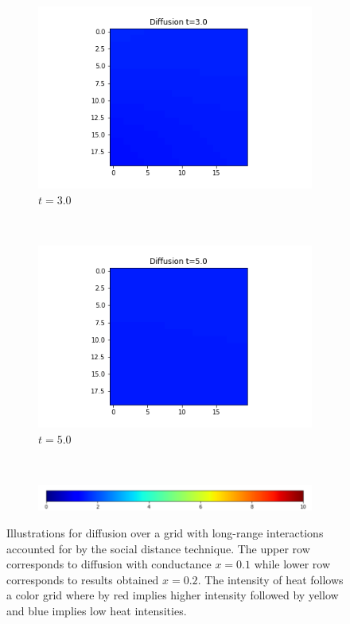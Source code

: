 \documentclass[10pt,a4paper]{article}
\begin{document}
\begin{enumerate}[i)]
\begin{enumerate}[a)]
\begin{figure}[!h]
\begin{subfigure}[b]{0.25\textwidth}
         				\includegraphics[width= \textwidth]{images/grid-t3-x02.png}
         				\caption{$t=3.0$}
         				\label{gridt3x02}
         			\end{subfigure}~
         			\begin{subfigure}[b]{0.25\textwidth}
         				\includegraphics[width= \textwidth]{images/grid-t5-x02.png}
         				\caption{$t=5.0$}
         				\label{gridt5x02}
         			\end{subfigure}\\
         			\vspace{0.25cm}
         			\begin{subfigure}[b]{0.60\textwidth}
         				\includegraphics[width= \textwidth]{images/colour-bar-grid.png}
         			\end{subfigure}
         			\caption{Illustrations for diffusion over a grid with long-range interactions accounted for by the social distance technique. The upper row corresponds to diffusion with conductance $x=0.1$ while lower row corresponds to results obtained $x=0.2$. The intensity of heat follows a color grid where by red implies higher intensity followed by yellow and blue implies low heat intensities.}
         			\label{gridlongrange}
         		\end{figure}
         		

\end{enumerate}
\end{enumerate}
\end{document}
